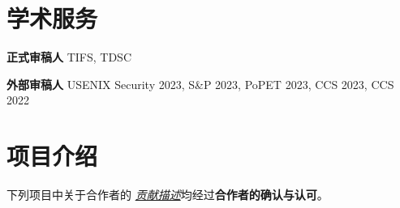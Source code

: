 \documentclass{resume}
\begin{document}
\section{\textbf{学术服务}}
\begin{content}
	\textbf{正式审稿人} \enspace TIFS, TDSC

	\textbf{外部审稿人} \enspace USENIX Security 2023, S\&P 2023, PoPET 2023, CCS 2023, CCS 2022
\end{content}

\section{\textbf{项目介绍}}

下列项目中关于合作者的 \underline{\textit{贡献描述}}均经过\textbf{合作者的确认与认可}。
\end{document}
